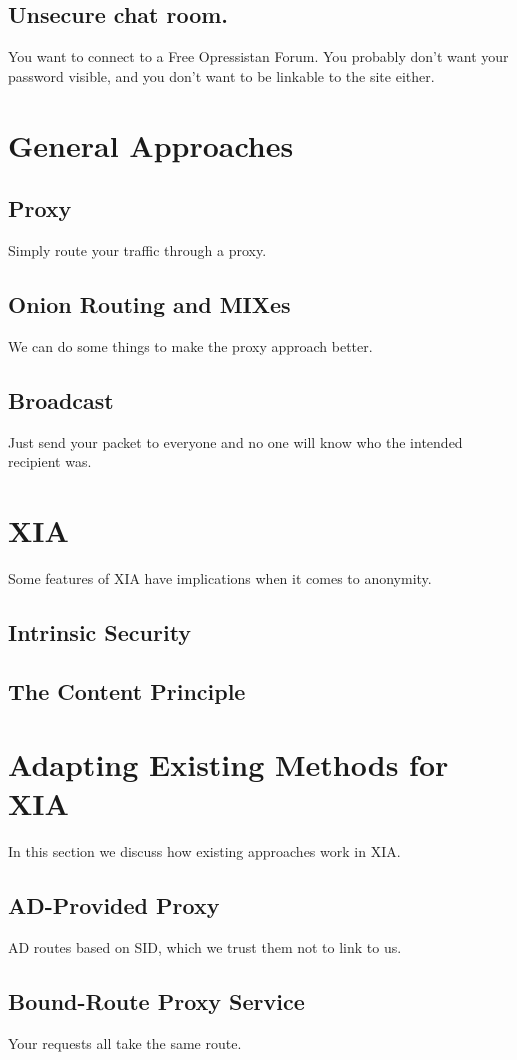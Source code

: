 \documentclass{article}
\begin{document}
\subsection{Unsecure chat room.}
You want to connect to a Free Opressistan Forum.  You probably don't want your password visible, and you don't want to be linkable to the site either.

\section{General Approaches}
\subsection{Proxy}
Simply route your traffic through a proxy.
\subsection{Onion Routing and MIXes}
We can do some things to make the proxy approach better.
\subsection{Broadcast}
Just send your packet to everyone and no one will know who the intended recipient was.

\section{XIA}
Some features of XIA have implications when it comes to anonymity.
\subsection{Intrinsic Security}
\subsection{The Content Principle}

\section{Adapting Existing Methods for XIA}
In this section we discuss how existing approaches work in XIA.
\subsection{AD-Provided Proxy}
AD routes based on SID, which we trust them not to link to us.
\subsection{Bound-Route Proxy Service}
Your requests all take the same route.
\end{document}
